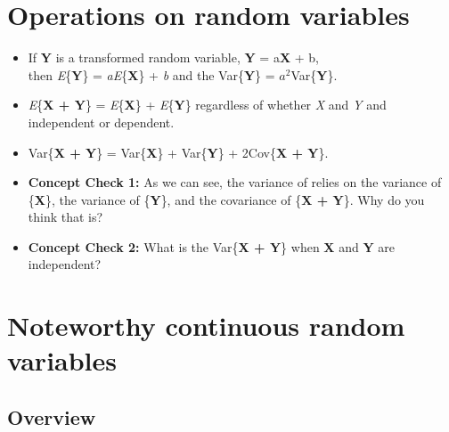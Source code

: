\documentclass[12pt]{report}
\begin{document}
\bigskip

\bigskip

\bigskip
\section{Operations on random variables}

\begin{itemize}

\item If \textbf{Y} is a transformed random variable, \textbf{Y} = a\textbf{X} + b, \\ 
then \textit{E}\{\textbf{Y}\} = \textit{aE}\{\textbf{X}\} + \textit{b} and the Var\{\textbf{Y}\} = $a^{2}$Var\{\textbf{Y}\}.

\item  \textit{E}\{\textbf{X + Y}\} = \textit{E}\{\textbf{X}\} + \textit{E}\{\textbf{Y}\} regardless of whether \textit{X} and \textit{Y} and independent or dependent. \\

\item Var\{\textbf{X + Y}\} = Var\{\textbf{X}\} + Var\{\textbf{Y}\} + 2Cov\{\textbf{X + Y}\}. \\

\item \textbf{Concept Check 1:} As we can see, the variance of  relies on the variance of \{\textbf{X}\}, the variance of \{\textbf{Y}\}, and the covariance of \{\textbf{X + Y}\}. Why do you think that is? 


\bigskip

\bigskip

\bigskip
\item \textbf{Concept Check 2:}  What is the Var\{\textbf{X + Y}\} when \textbf{X} and \textbf{Y} are independent? 

\end{itemize}

\bigskip

\bigskip

\bigskip
\section{Noteworthy continuous random variables}

\subsection{Overview}
\end{document}
